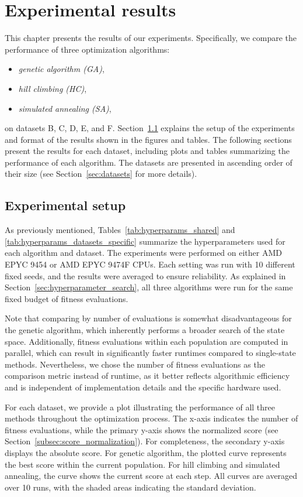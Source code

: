 \chapter{Experimental results} \label{chap:experimental_results}

This chapter presents the results of our experiments. Specifically, we compare the performance of three optimization algorithms:
\begin{itemize}
    \item \textit{genetic algorithm (GA)},
    \item \textit{hill climbing (HC)},
    \item \textit{simulated annealing (SA)},
\end{itemize}
on datasets B, C, D, E, and F.
Section~\ref{sec:experimental_setup} explains the setup of the experiments and format of the results shown in the figures and tables. The following sections present the results for each dataset, including plots and tables summarizing the performance of each algorithm. The datasets are presented in ascending order of their size (see Section~\ref{sec:datasets} for more details).

\section{Experimental setup} \label{sec:experimental_setup}

As previously mentioned, Tables~\ref{tab:hyperparams_shared} and \ref{tab:hyperparams_datasets_specific} summarize the hyperparameters used for each algorithm and dataset. The experiments were performed on either AMD EPYC 9454 or AMD EPYC 9474F CPUs. Each setting was run with 10 different fixed seeds, and the results were averaged to ensure reliability. As explained in Section~\ref{sec:hyperparameter_search}, all three algorithms were run for the same fixed budget of fitness evaluations.

Note that comparing by number of evaluations is somewhat disadvantageous for the genetic algorithm, which inherently performs a broader search of the state space. Additionally, fitness evaluations within each population are computed in parallel, which can result in significantly faster runtimes compared to single-state methods. Nevertheless, we chose the number of fitness evaluations as the comparison metric instead of runtime, as it better reflects algorithmic efficiency and is independent of implementation details and the specific hardware used.

For each dataset, we provide a plot illustrating the performance of all three methods throughout the optimization process. The x-axis indicates the number of fitness evaluations, while the primary y-axis shows the normalized score (see Section~\ref{subsec:score_normalization}).
For completeness, the secondary y-axis displays the absolute score.
For genetic algorithm, the plotted curve represents the best score within the current population. For hill climbing and simulated annealing, the curve shows the current score at each step.  All curves are averaged over 10 runs, with the shaded areas indicating the standard deviation.

